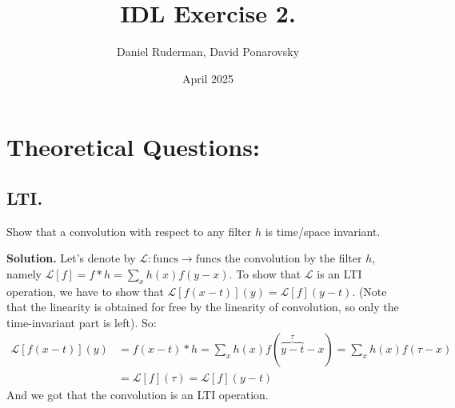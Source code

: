 \documentclass{article}
\title{IDL Exercise 2.}
\author{Daniel Ruderman, David Ponarovsky}
\date{April 2025}
\begin{document}
\maketitle

\section{Theoretical Questions:}

\subsection{LTI.} Show that a convolution with respect to any filter $h$ is time/space invariant.


\textbf{Solution.} Let's denote by $\mathcal{L} : \text{funcs} \rightarrow \text{funcs}$ the convolution by the filter $h$, namely $\mathcal{L}[f] = f*h = \sum_{x}{h(x)f(y-x)}$. To show that $\mathcal{L}$ is an LTI operation, we have to show that $\mathcal{L}[f(x-t)](y) = \mathcal{L}[f](y-t)$. (Note that the linearity is obtained for free by the linearity of convolution, so only the time-invariant part is left). So:
\begin{equation*}
    \begin{split}
      \mathcal{L}[f(x-t)](y) &=  f(x-t)*h = \sum_{x}{h(x)f( \overbrace{y-t}^{\tau}-x)} = \sum_{x}{h(x)f(\tau-x)}\\
      &= \mathcal{L}[f](\tau) = \mathcal{L}[f](y-t)
    \end{split}
\end{equation*}
And we got that the convolution is an LTI operation.
 
\end{document}
